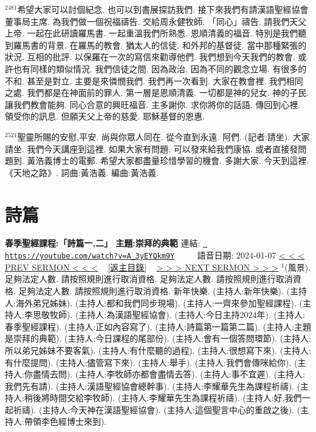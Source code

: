\documentclass{book}
\begin{document}
$^{2481}$希望大家可以討個紀念.
也可以到書展探訪我們.
接下來我們有請漢語聖經協會董事局主席.
為我們做一個祝福禱告.
交給周永健牧師.
「同心」禱告.
請我們天父上帝.
一起在此研讀羅馬書.
一起重溫我們所熟悉.
恩順清義的福音.
特別是我們聽到羅馬書的背景.
在羅馬的教會.
猶太人的信徒.
和外邦的基督徒.
當中那種緊張的狀況.
互相的批評.
以保羅在一次的寫信來勸導他們.
我們想到今天我們的教會.
或許也有同樣的類似情況.
我們信徒之間.
因為政治.
因為不同的觀念立場.
有很多的不和.
甚至是對立.
主要是來憐憫我們.
我們再一次看到.
大家在教會裡.
我們相同之處.
我們都是在神面前的罪人.
第一層是恩順清義.
一切都是神的兒女.
神的子民.
讓我們教會能夠.
同心合意的興旺福音.
主多謝你.
求你將你的話語.
傳回到心裡.
領受你的訊息.
但願天父上帝的慈愛.
耶穌基督的恩惠.

$^{2521}$聖靈所賜的安慰,平安.
尚與你眾人同在.
從今直到永遠.
阿們.
(記者:請坐).
大家請坐.
我們今天講座到這裡.
如果大家有問題.
可以發來給我們康協.
或者直接發問題到.
黃浩義博士的電郵.
希望大家都盡量珍惜學習的機會.
多謝大家.
今天到這裡.
《天地之路》.
詞曲:黃浩義.
編曲:黃浩義.
\newpage



\section{詩篇}
\label{sec:A_3yEYQkm9Y}
\textbf{春季聖經課程:「詩篇一,二」 主題:崇拜的典範}
\newline
\newline
連結: \href{https://youtube.com/watch?v=A_3yEYQkm9Y}{\texttt{ https://youtube.com/watch?v=A\_3yEYQkm9Y}} ~~~~ 語音日期: 2024-01-07 
\newline
\newline
\hyperref[sec:VhiGoXEG1RY]{\small{< < < PREV SERMON < < <}}
~
\hyperref[sec:index]{\small{[返主目錄]}}
~
\hyperref[sec:SrQmAQLb4ew]{\small{> > > NEXT SERMON > > >}}
\newline
\newline
$^{1}$(風景).
足夠法定人數.
請按照規則進行取消資格.
足夠法定人數.
請按照規則進行取消資格.
足夠法定人數.
請按照規則進行取消資格.
新年快樂.
(主持人:新年快樂).
(主持人:海外弟兄姊妹).
(主持人:都和我們同步現場).
(主持人:一齊來參加聖經課程).
(主持人:李思敬牧師).
(主持人:為漢語聖經協會).
(主持人:今日主持2024年).
(主持人:春季聖經課程).
(主持人:正如內容寫了).
(主持人:詩篇第一篇第二篇).
(主持人:主題是崇拜的典範).
(主持人:今日課程的尾部份).
(主持人:會有一個答問環節).
(主持人:所以弟兄姊妹不要客氣).
(主持人:有什麼聽的過程).
(主持人:很想寫下來).
(主持人:有什麼提問).
(主持人:儘管寫下來).
(主持人:舉手).
(主持人:我們會傳咪給你).
(主持人:你盡情去問).
(主持人:李牧師亦都會盡情去答).
(主持人:事不宜遲).
(主持人:我們先有請).
(主持人:漢語聖經協會總幹事).
(主持人:李耀華先生為課程祈禱).
(主持人:稍後將時間交給李牧師).
(主持人:李耀華先生為課程祈禱).
(主持人:好,我們一起祈禱).
(主持人:今天神在漢語聖經協會).
(主持人:這個聖言中心的重啟之後).
(主持人:帶領李色經博士來到).
\end{document}
